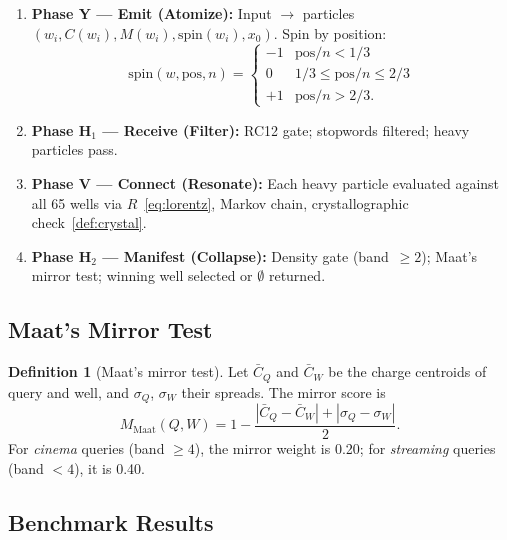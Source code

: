 \documentclass[12pt,a4paper]{article}
\theoremstyle{plain}
\theoremstyle{definition}
\newtheorem{definition}[theorem]{Definition}
\theoremstyle{remark}
\begin{document}
\begin{enumerate}
  \item \textbf{Phase Y --- Emit (Atomize):}
    Input $\to$ particles $(w_i, C(w_i), M(w_i), \text{spin}(w_i), x_0)$.
    Spin by position:
    \begin{equation}
    \text{spin}(w, \text{pos}, n) =
    \begin{cases}-1 & \text{pos}/n < 1/3 \\ 0 & 1/3\leq\text{pos}/n\leq 2/3 \\ +1 & \text{pos}/n > 2/3.\end{cases}
    \end{equation}
  \item \textbf{Phase H$_1$ --- Receive (Filter):}
    RC12 gate; stopwords filtered; heavy particles pass.
  \item \textbf{Phase V --- Connect (Resonate):}
    Each heavy particle evaluated against all 65 wells via
    $R$~\eqref{eq:lorentz}, Markov chain, crystallographic
    check~\eqref{def:crystal}.
  \item \textbf{Phase H$_2$ --- Manifest (Collapse):}
    Density gate (band~$\geq 2$); Maat's mirror test;
    winning well selected or $\emptyset$ returned.
\end{enumerate}

\subsection{Maat's Mirror Test}

\begin{definition}[Maat's mirror test]
Let $\bar C_Q$ and $\bar C_W$ be the charge centroids of query and well,
and $\sigma_Q$, $\sigma_W$ their spreads.  The mirror score is
\begin{equation}
M_{\text{Maat}}(Q,W)
= 1 - \frac{|\bar C_Q - \bar C_W| + |\sigma_Q - \sigma_W|}{2}.
\end{equation}
For \emph{cinema} queries (band $\geq 4$), the mirror weight is 0.20;
for \emph{streaming} queries (band $< 4$), it is 0.40.
\end{definition}

\subsection{Benchmark Results}
\end{document}
